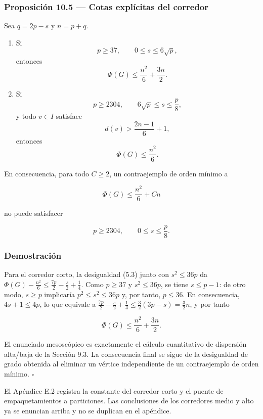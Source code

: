 \documentclass[
  spanish,
  11pt,
  a4paper,
]{article}
\begin{document}
\subsubsection{Proposición 10.5 --- Cotas explícitas del corredor}\label{proposiciuxf3n-10.5-cotas-expluxedcitas-del-corredor}

Sea \(q=2p-s\) y \(n=p+q\).

\begin{enumerate}
\def\labelenumi{\arabic{enumi}.}
\item
  Si \[
  p\ge37,
  \qquad
  0\le s\le6\sqrt p,
  \] entonces \[
  \boxed{
  \Phi(G)\le\frac{n^2}{6}+\frac{3n}{2}.
  }
  \tag{10.2}
  \]
\item
  Si \[
  p\ge2304,
  \qquad
  6\sqrt p\le s\le\frac p8,
  \] y todo \(v\in I\) satisface \[
  d(v)>\frac{2n-1}{6}+1,
  \] entonces \[
  \boxed{
  \Phi(G)\le\frac{n^2}{6}.
  }
  \tag{10.3}
  \]
\end{enumerate}

En consecuencia, para todo \(C\ge2\), un contraejemplo de orden mínimo a

\[
\Phi(G)\le\frac{n^2}{6}+Cn
\]

no puede satisfacer

\[
p\ge2304,
\qquad
0\le s\le\frac p8.
\]

\subsubsection{Demostración}\label{demostraciuxf3n-8}

Para el corredor corto, la desigualdad (5.3) junto con \(s^2\le36p\) da \(\Phi(G)-\tfrac{n^2}{6}\le\tfrac{7p}{2}-\tfrac{s}{2}+\tfrac14\). Como \(p\ge37\) y \(s^2\le36p\), se tiene \(s\le p-1\): de otro modo, \(s\ge p\) implicaría \(p^2\le s^2\le36p\) y, por tanto, \(p\le36\). En consecuencia, \(4s+1\le4p\), lo que equivale a \(\tfrac{7p}{2}-\tfrac{s}{2}+\tfrac14\le\tfrac32(3p-s)=\tfrac32n\), y por tanto

\[
\Phi(G)\le\frac{n^2}{6}+\frac{3n}{2}.
\]

El enunciado mesoscópico es exactamente el cálculo cuantitativo de dispersión alta/baja de la Sección 9.3. La consecuencia final se sigue de la desigualdad de grado obtenida al eliminar un vértice independiente de un contraejemplo de orden mínimo. \(\square\)

El Apéndice E.2 registra la constante del corredor corto y el puente de empaquetamientos a particiones. Las conclusiones de los corredores medio y alto ya se enuncian arriba y no se duplican en el apéndice.
\end{document}
